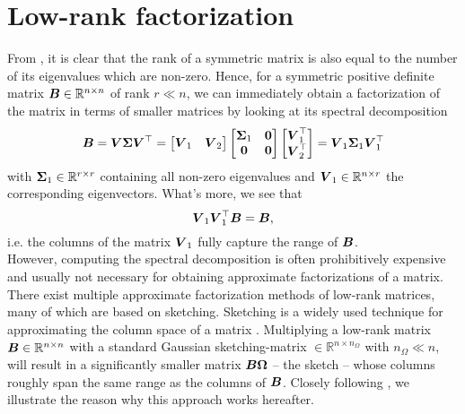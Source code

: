
\section{Low-rank factorization}
\label{sec:3-nystrom-nystrom}

From , it is clear that the rank of a symmetric
matrix is also equal to the number of its eigenvalues which are non-zero.
Hence, for a symmetric positive definite matrix $\boldsymbol{B} \in \mathbb{R}^{n \times n}$
of rank $r \ll n$, we can immediately obtain a factorization of the matrix in
terms of smaller matrices by looking at its spectral decomposition
\begin{equation}
    \boldsymbol{B}
        = \boldsymbol{V} \boldsymbol{\Sigma} \boldsymbol{V}^{\top} 
        = \begin{bmatrix} \boldsymbol{V}_1 & \boldsymbol{V}_2 \end{bmatrix} 
          \begin{bmatrix} \boldsymbol{\Sigma}_1 & \boldsymbol{0} \\ \boldsymbol{0} & \boldsymbol{0} \end{bmatrix} 
          \begin{bmatrix} \boldsymbol{V}_1^{\top} \\ \boldsymbol{V}_2^{\top} \end{bmatrix}
        = \boldsymbol{V}_1 \boldsymbol{\Sigma}_1 \boldsymbol{V}_1^{\top}
    \label{equ:3-nystrom-eigenvalue-decoposition}
\end{equation}
with $\boldsymbol{\Sigma}_1 \in \mathbb{R}^{r \times r}$ containing all non-zero
eigenvalues and $\boldsymbol{V}_1 \in \mathbb{R}^{n \times r}$ the corresponding
eigenvectors. What's more, we see that
\begin{equation}
    \boldsymbol{V}_1 \boldsymbol{V}_1^{\top} \boldsymbol{B} = \boldsymbol{B},
    \label{equ:3-nystrom-range-captured}
\end{equation}
i.e. the columns of the matrix $\boldsymbol{V}_1$ fully capture the range of $\boldsymbol{B}$.\\

However, computing the spectral
decomposition is often prohibitively expensive and usually not necessary for
obtaining approximate factorizations of a matrix. There exist multiple approximate
factorization methods of low-rank matrices, many of which are based on sketching.
Sketching is a widely used technique for approximating the column space of a matrix
\cite{halko2011finding,woodruff2014sketching,lin2017randomized,tropp2017sketching,tropp2023randomized}.
Multiplying a low-rank matrix $\boldsymbol{B} \in \mathbb{R}^{n \times n}$ with a standard Gaussian
\gls{sketching-matrix} $\in \mathbb{R}^{n \times n_{\Omega}}$ with $n_{\Omega} \ll n$, will
result in a significantly smaller matrix $\boldsymbol{B}\boldsymbol{\Omega}$ -- the sketch -- whose
columns roughly span the same range as the columns of $\boldsymbol{B}$.
Closely following \cite[section~2.1]{tropp2023randomized}, we illustrate the
reason why this approach works hereafter.\\

